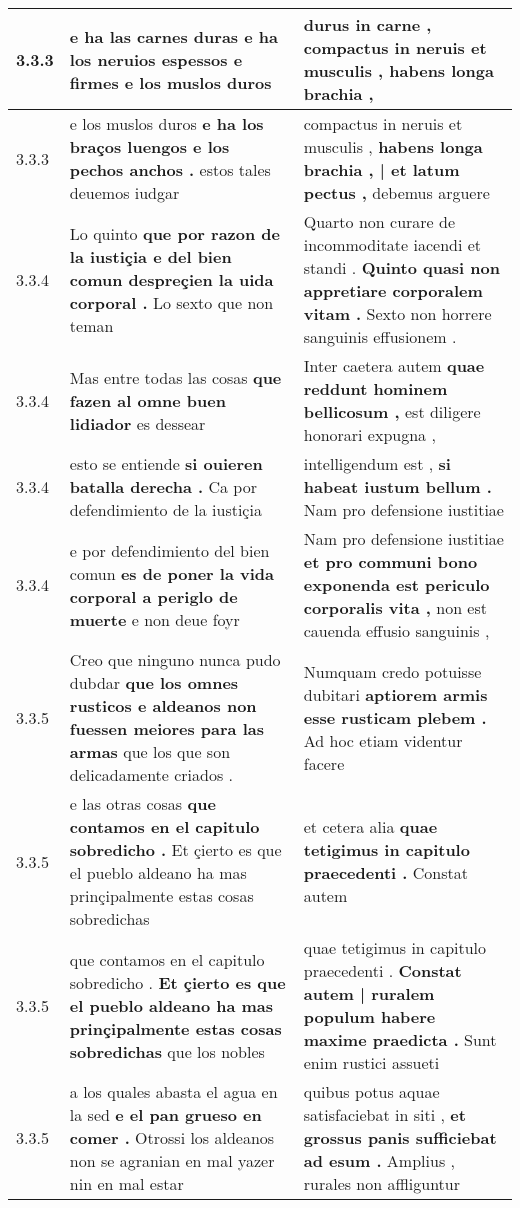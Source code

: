 \begin{tabular}{|p{1cm}|p{6.5cm}|p{6.5cm}|}
3.3.3 & e ha las carnes duras \textbf{ e ha los neruios espessos e firmes } e los muslos duros & durus in carne , \textbf{ compactus in neruis et musculis , } habens longa brachia , \\\hline
3.3.3 & e los muslos duros \textbf{ e ha los braços luengos e los pechos anchos . } estos tales deuemos iudgar & compactus in neruis et musculis , \textbf{ habens longa brachia , | et latum pectus , } debemus arguere \\\hline
3.3.4 & Lo quinto \textbf{ que por razon de la iustiçia e del bien comun despreçien la uida corporal . } Lo sexto que non teman & Quarto non curare de incommoditate iacendi et standi . \textbf{ Quinto quasi non appretiare corporalem vitam . } Sexto non horrere sanguinis effusionem . \\\hline
3.3.4 & Mas entre todas las cosas \textbf{ que fazen al omne buen lidiador } es dessear & Inter caetera autem \textbf{ quae reddunt hominem bellicosum , } est diligere honorari expugna , \\\hline
3.3.4 & esto se entiende \textbf{ si ouieren batalla derecha . } Ca por defendimiento de la iustiçia & intelligendum est , \textbf{ si habeat iustum bellum . } Nam pro defensione iustitiae \\\hline
3.3.4 & e por defendimiento del bien comun \textbf{ es de poner la vida corporal a periglo de muerte } e non deue foyr & Nam pro defensione iustitiae \textbf{ et pro communi bono exponenda est periculo corporalis vita , } non est cauenda effusio sanguinis , \\\hline
3.3.5 & Creo que ninguno nunca pudo dubdar \textbf{ que los omnes rusticos e aldeanos non fuessen meiores para las armas } que los que son delicadamente criados . & Numquam credo potuisse dubitari \textbf{ aptiorem armis esse rusticam plebem . } Ad hoc etiam videntur facere \\\hline
3.3.5 & e las otras cosas \textbf{ que contamos en el capitulo sobredicho . } Et çierto es que el pueblo aldeano ha mas prinçipalmente estas cosas sobredichas & et cetera alia \textbf{ quae tetigimus in capitulo praecedenti . } Constat autem \\\hline
3.3.5 & que contamos en el capitulo sobredicho . \textbf{ Et çierto es que el pueblo aldeano ha mas prinçipalmente estas cosas sobredichas } que los nobles & quae tetigimus in capitulo praecedenti . \textbf{ Constat autem | ruralem populum habere maxime praedicta . } Sunt enim rustici assueti \\\hline
3.3.5 & a los quales abasta el agua en la sed \textbf{ e el pan grueso en comer . } Otrossi los aldeanos non se agranian en mal yazer nin en mal estar & quibus potus aquae satisfaciebat in siti , \textbf{ et grossus panis sufficiebat ad esum . } Amplius , rurales non affliguntur \\\hline

\end{tabular}
